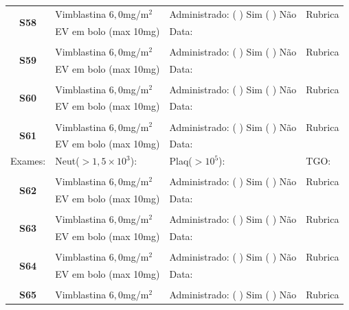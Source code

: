 \documentclass[11pt,a4paper,oldfontcommands]{memoir}
\begin{document}
\begin{center}
\begin{table}[H]
\begin{tabular}{p{}p{}|p{}|p{3cm}}
    \hline
    \multicolumn{1}{c|}{\multirow{2}{*}{\textbf{S58}}}&{Vimblastina \(6,0\)mg/m\(^2\)}&{Administrado: (  ) Sim (  ) Não}&{Rubrica}\\
    \multicolumn{1}{c|}{}&{EV em bolo (max 10mg)}&{Data:}&\\
    \hline
    \\
    \hline
    \multicolumn{1}{c|}{\multirow{2}{*}{\textbf{S59}}}&{Vimblastina \(6,0\)mg/m\(^2\)}&{Administrado: (  ) Sim (  ) Não}&{Rubrica}\\
    \multicolumn{1}{c|}{}&{EV em bolo (max 10mg)}&{Data:}&\\
    \hline
    \\
    \hline
    \multicolumn{1}{c|}{\multirow{2}{*}{\textbf{S60}}}&{Vimblastina \(6,0\)mg/m\(^2\)}&{Administrado: (  ) Sim (  ) Não}&{Rubrica}\\
    \multicolumn{1}{c|}{}&{EV em bolo (max 10mg)}&{Data:}&\\
    \hline
    \\
    \hline
    \multicolumn{1}{c|}{\multirow{2}{*}{\textbf{S61}}}&{Vimblastina \(6,0\)mg/m\(^2\)}&{Administrado: (  ) Sim (  ) Não}&{Rubrica}\\
    \multicolumn{1}{c|}{}&{EV em bolo (max 10mg)}&{Data:}&\\
    \hline
    {Exames:}&{Neut(\(>1,5\times10^3\)):}&{Plaq(\(>10^5\)):}&{TGO:}
    \\
    \hline
    \\
    \hline
    \multicolumn{1}{c|}{\multirow{2}{*}{\textbf{S62}}}&{Vimblastina \(6,0\)mg/m\(^2\)}&{Administrado: (  ) Sim (  ) Não}&{Rubrica}\\
    \multicolumn{1}{c|}{}&{EV em bolo (max 10mg)}&{Data:}&\\
    \hline
    \\
    \hline
    \multicolumn{1}{c|}{\multirow{2}{*}{\textbf{S63}}}&{Vimblastina \(6,0\)mg/m\(^2\)}&{Administrado: (  ) Sim (  ) Não}&{Rubrica}\\
    \multicolumn{1}{c|}{}&{EV em bolo (max 10mg)}&{Data:}&\\
    \hline
    \\
    \hline
    \multicolumn{1}{c|}{\multirow{2}{*}{\textbf{S64}}}&{Vimblastina \(6,0\)mg/m\(^2\)}&{Administrado: (  ) Sim (  ) Não}&{Rubrica}\\
    \multicolumn{1}{c|}{}&{EV em bolo (max 10mg)}&{Data:}&\\
    \hline
    \\
    \hline
    \multicolumn{1}{c|}{\multirow{2}{*}{\textbf{S65}}}&{Vimblastina \(6,0\)mg/m\(^2\)}&{Administrado: (  ) Sim (  ) Não}&{Rubrica}\\

\end{tabular}
\end{table}
\end{center}
\end{document}
